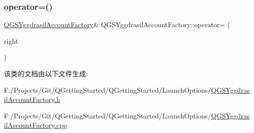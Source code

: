 \subsubsection{\texorpdfstring{operator=()}{operator=()}\hspace{0.1cm}{\footnotesize\ttfamily [2/2]}}
{\footnotesize\ttfamily \mbox{\hyperlink{class_q_g_s_yggdrasil_account_factory}{Q\+G\+S\+Yggdrasil\+Account\+Factory}}\& Q\+G\+S\+Yggdrasil\+Account\+Factory\+::operator= (\begin{DoxyParamCaption}\item[{\mbox{\hyperlink{class_q_g_s_yggdrasil_account_factory}{Q\+G\+S\+Yggdrasil\+Account\+Factory}} \&\&}]{right }\end{DoxyParamCaption})\hspace{0.3cm}{\ttfamily [delete]}}



该类的文档由以下文件生成\+:\begin{DoxyCompactItemize}
\item 
F\+:/\+Projects/\+Git/\+Q\+Getting\+Started/\+Q\+Getting\+Started/\+Launch\+Options/\mbox{\hyperlink{_q_g_s_yggdrasil_account_factory_8h}{Q\+G\+S\+Yggdrasil\+Account\+Factory.\+h}}\item 
F\+:/\+Projects/\+Git/\+Q\+Getting\+Started/\+Q\+Getting\+Started/\+Launch\+Options/\mbox{\hyperlink{_q_g_s_yggdrasil_account_factory_8cpp}{Q\+G\+S\+Yggdrasil\+Account\+Factory.\+cpp}}\end{DoxyCompactItemize}
